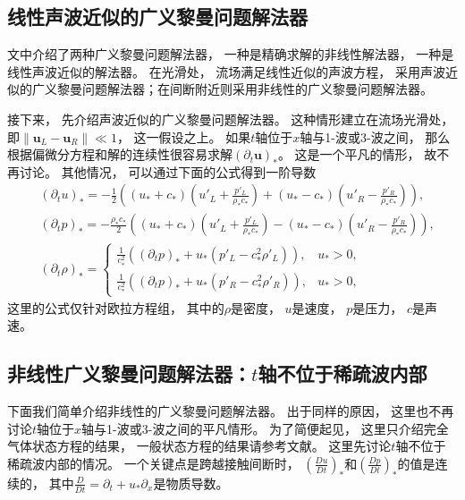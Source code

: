 \subsection{线性声波近似的广义黎曼问题解法器}

文\cite{GRP}中介绍了两种广义黎曼问题解法器，
一种是精确求解的非线性解法器，
一种是线性声波近似的解法器。
在光滑处，
流场满足线性近似的声波方程，
采用声波近似的广义黎曼问题解法器；在间断附近则采用非线性的广义黎曼问题解法器。

接下来，
先介绍声波近似的广义黎曼问题解法器。
这种情形建立在流场光滑处，
即$\|\bm u_L-\bm u_R\|\ll 1$，
这一假设之上。
如果$t$轴位于$x$轴与1-波或3-波之间，
那么根据偏微分方程和解的连续性很容易求解$\left({\partial_t}\bm u\right)_*$。
这是一个平凡的情形，
故不再讨论。
其他情况，
可以通过下面的公式得到一阶导数
\begin{align}
   & \left({\partial_t}u\right)_* = -\frac{1}{2}\left(\left(u_*+c_*\right)\left(u'_L+\frac{p'_L}{\rho_*c_*}\right)+\left(u_*-c_*\right)\left(u'_R-\frac{p'_R}{\rho_*c_*}\right)\right),         \\
   & \left({\partial_t}p\right)_* = -\frac{\rho_*c_*}{2}\left(\left(u_*+c_*\right)\left(u'_L+\frac{p'_L}{\rho_*c_*}\right)-\left(u_*-c_*\right)\left(u'_R-\frac{p'_R}{\rho_*c_*}\right)\right), \\
   & \left({\partial_t}\rho\right)_* =
  \begin{cases}
    \frac{1}{c_*^2}\left(\left({\partial_t}p\right)_*+u_*\left(p'_L-c_*^2\rho'_L\right)\right), & u_* > 0,  \\
    \frac{1}{c_*^2}\left(\left({\partial_t}p\right)_*+u_*\left(p'_R-c_*^2\rho'_R\right)\right), & u_* > 0,
  \end{cases}
\end{align}
这里的公式仅针对欧拉方程组，
其中的$\rho$是密度，
$u$是速度，
$p$是压力，
$c$是声速。

\subsection{非线性广义黎曼问题解法器：\texorpdfstring{$t$}{t}轴不位于稀疏波内部}

下面我们简单介绍非线性的广义黎曼问题解法器。
出于同样的原因，
这里也不再讨论$t$轴位于$x$轴与1-波或3-波之间的平凡情形。
为了简便起见，
这里只介绍完全气体状态方程的结果，
一般状态方程的结果请参考文献\cite{GRP}。
这里先讨论$t$轴不位于稀疏波内部的情况。
一个关键点是跨越接触间断时，
$\left(\frac{Du}{Dt}\right)_*$和$\left(\frac{Dp}{Dt}\right)_*$的值是连续的，
其中$\frac{D}{Dt} = {\partial_t} + u_* {\partial_x}$是物质导数。

